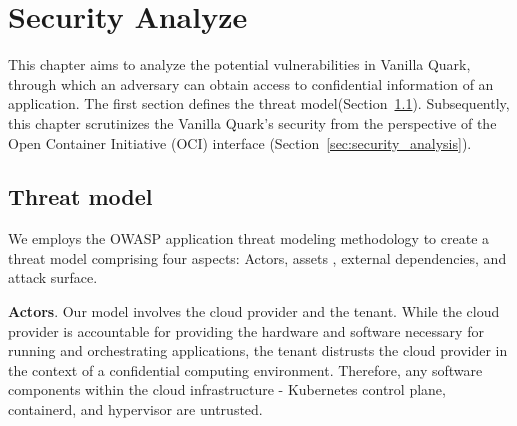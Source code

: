 \chapter{Security Analyze}
\label{sec:security_analyse}





This chapter aims to analyze the potential vulnerabilities in Vanilla Quark, through which an adversary can obtain access to confidential information of an application. The first section defines the threat model(Section~\ref{sec:Threat_model}). 
Subsequently, this chapter scrutinizes the Vanilla Quark's security from the perspective of the Open Container Initiative (OCI) interface (Section~\ref{sec:security_analysis}).



\section{Threat model}
\label{sec:Threat_model}
We employs the OWASP application threat modeling methodology\cite*{OWASP_Threat_Modeling} to create a threat model comprising four aspects: Actors, assets , external dependencies, and attack surface.

\textbf{Actors}. Our model involves the cloud provider and the tenant. While the cloud provider is accountable for providing the hardware and software necessary for running and orchestrating applications, the tenant distrusts the cloud provider 
in the context of a confidential computing environment. Therefore, any software components within the cloud infrastructure - Kubernetes control plane\cite*{k8s}, containerd\cite*{containerd}, and hypervisor are untrusted.

